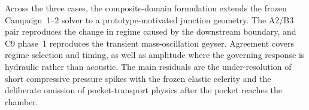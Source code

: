 Across the three cases, the composite-domain formulation extends the frozen
Campaign~1--2 solver to a prototype-motivated junction geometry. The A2/B3
pair reproduces the change in regime caused by the downstream boundary, and C9
phase~1 reproduces the transient mass-oscillation geyser. Agreement covers
regime selection and timing, as well as amplitude where the governing response
is hydraulic rather than acoustic. The main residuals are the
under-resolution of short compressive pressure spikes with the frozen elastic
celerity and the deliberate omission of pocket-transport physics after the
pocket reaches the chamber.
